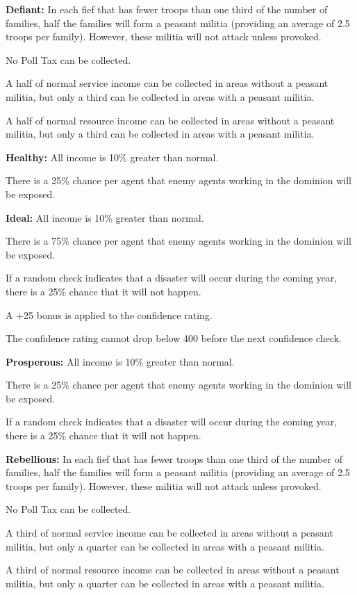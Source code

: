 \begin{multicols*}{2}
\textbf{Defiant:} In each fief that has fewer troops than one third of the number of families, half the families will form a peasant militia (providing an average of 2.5 troops per family). However, these militia will not attack unless provoked.

No Poll Tax can be collected.

A half of normal service income can be collected in areas without a peasant militia, but only a third can be collected in areas with a peasant militia.

A half of normal resource income can be collected in areas without a peasant militia, but only a third can be collected in areas with a peasant militia.

\textbf{Healthy:} All income is 10\% greater than normal.

There is a 25\% chance per agent that enemy agents working in the dominion will be exposed.

\textbf{Ideal:} All income is 10\% greater than normal.

There is a 75\% chance per agent that enemy agents working in the dominion will be exposed.

If a random check indicates that a disaster will occur during the coming year, there is a 25\% chance that it will not happen.

A +25 bonus is applied to the confidence rating.

The confidence rating cannot drop below 400 before the next confidence check.

\textbf{Prosperous:} All income is 10\% greater than normal.

There is a 25\% chance per agent that enemy agents working in the dominion will be exposed.

If a random check indicates that a disaster will occur during the coming year, there is a 25\% chance that it will not happen.

\textbf{Rebellious:} In each fief that has fewer troops than one third of the number of families, half the families will form a peasant militia (providing an average of 2.5 troops per family). However, these militia will not attack unless provoked.

No Poll Tax can be collected.

A third of normal service income can be collected in areas without a peasant militia, but only a quarter can be collected in areas with a peasant militia.

A third of normal resource income can be collected in areas without a peasant militia, but only a quarter can be collected in areas with a peasant militia.


\end{multicols*}
